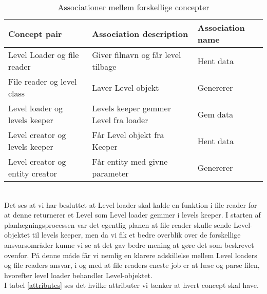 \begin{table}[!h]
\centering
\begin{tabular}{|l|l|l|}
\hline
\textbf{Concept pair}           & \textbf{Association description}      & \textbf{Association name} \\ \hline
Level Loader og file reader     & Giver filnavn og får level tilbage    & Hent data                 \\ \hline
File reader og level class      & Laver Level objekt                    & Genererer                 \\ \hline
Level loader og levels keeper   & Levels keeper gemmer Level fra loader & Gem data                  \\ \hline
Level creator og levels keeper  & Får Level objekt fra Keeper           & Hent data                 \\ \hline
Level creator og entity creator & Får entity med givne parameter        & Genererer                 \\ \hline
\end{tabular}
\caption{Associationer mellem forskellige concepter}
\label{associations}
\end{table}\\
Det ses at vi har besluttet at Level loader skal kalde en funktion i file reader for at denne returnerer et Level som Level loader gemmer i levels keeper. I starten af planlægningsprocessen var det egentlig planen at file reader skulle sende Level-objektet til levels keeper, men da vi fik et bedre overblik over de forskellige ansvarsområder kunne vi se at det gav bedre mening at gøre det som beskrevet ovenfor. På denne måde får vi nemlig en klarere adskillelse mellem Level loaders og file readers ansvar, i og med at file readers eneste job er at læse og parse filen, hvorefter level loader behandler Level-objektet.\\
I tabel \ref{attributes} ses det hvilke attributer vi tænker at hvert concept skal have.
